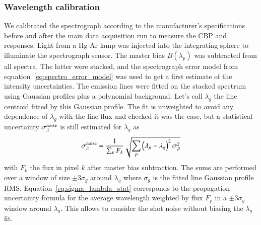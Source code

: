 \subsubsection{Wavelength calibration}

We calibrated the spectrograph according to the manufacturer's specifications before and after the main data acquisition run to measure the CBP and \SD responses. Light from a Hg-Ar lamp was injected into the integrating sphere to illuminate the spectrograph sensor. The master bias $B(\lambda_p)$ was subtracted from all spectra. The latter were stacked, and the spectrograph error model from equation~\ref{eq:spectro_error_model} was used to get a first estimate of the intensity uncertainties. The emission lines were fitted on the stacked spectrum using Gaussian profiles plus a polynomial background. Let's call $\lambda_g$ the line centroid fitted by this Gaussian profile. The fit is unweighted to avoid any dependence of $\lambda_g$ with the line flux and checked it was the case, but a statistical uncertainty $\sigma_\lambda^{\rm noise}$ is still estimated for $\lambda_g$ as 
\begin{equation}\label{eq:sigma_lambda_stat}
    \sigma_\lambda^{\rm noise}= \dfrac{1}{\sum_k F_k} \sqrt{\sum_p \left(\lambda_p - \lambda_g\right)^2 \sigma_p^2}
\end{equation}
with $F_k$ the flux in pixel $k$ after master bias subtraction. The sums are performed over a window of size $\pm 3 \sigma_g$ around $\lambda_g$ where $\sigma_g$ is the fitted line Gaussian profile RMS. Equation~\ref{eq:sigma_lambda_stat} corresponds to the propagation uncertainty formula for the average wavelength weighted by flux $F_p$ in a $\pm 3 \sigma_g$  window around $\lambda_g$. This allows to consider the shot noise without biasing the $\lambda_g$ fit.

